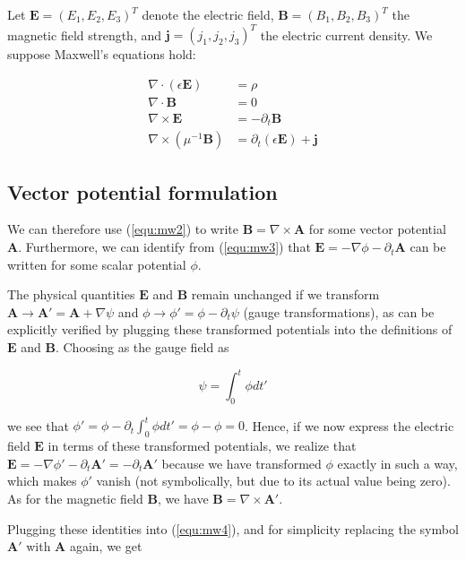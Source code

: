 \documentclass[11pt, a4paper]{article}
\begin{document}
Let $\mathbf{E} = (E_1, E_2, E_3)^T$ denote the electric field,
$\mathbf{B} = (B_1, B_2, B_3)^T$ the magnetic field strength, and 
$\mathbf{j} = (j_1, j_2, j_3)^T$ the electric current density. 
We suppose Maxwell's equations hold:

\begin{align}
    \nabla \cdot (\epsilon \mathbf{E}) &= \rho \label{equ:mw1} \\
    \nabla \cdot \mathbf{B} &= 0 \label{equ:mw2} \\
    \nabla \times \mathbf{E} &= -\partial_t \mathbf{B} \label{equ:mw3} \\
    \nabla \times (\mu^{-1} \mathbf{B}) &= \partial_t (\epsilon \mathbf{E}) + \mathbf{j} \label{equ:mw4}
\end{align}

\subsection{Vector potential formulation}
\label{subsec:vectorpot}

We can therefore use (\ref{equ:mw2}) to write $\mathbf{B} = \nabla \times \mathbf{A}$ for some vector
potential $\mathbf{A}$. Furthermore, we can identify from (\ref{equ:mw3}) that
$\mathbf{E} = -\nabla \phi - \partial_t \mathbf{A}$ can be written for some
scalar potential $\phi$.

The physical quantities $\mathbf{E}$ and $\mathbf{B}$ remain unchanged 
if we transform $\mathbf{A} \to \mathbf{A}' = \mathbf{A} + \nabla \psi$ and
$\phi \to \phi' = \phi - \partial_t \psi$ (gauge transformations), 
as can be explicitly verified by plugging these transformed potentials into the
definitions of $\mathbf{E}$ and $\mathbf{B}$. Choosing as the gauge field as 

\begin{equation}
    \psi = \int_0^t \phi dt'
\end{equation}

we see that $\phi' = \phi - \partial_t \int_0^t \phi dt' = \phi - \phi = 0$.
Hence, if we now express the electric field $\mathbf{E}$ in terms of these transformed 
potentials, we realize that $\mathbf{E} = -\nabla \phi' - \partial_t \mathbf{A}' = -\partial_t \mathbf{A}'$
because we have transformed $\phi$ exactly in such a way, which makes $\phi'$ vanish
(not symbolically, but due to its actual value being zero).
As for the magnetic field $\mathbf{B}$, we have $\mathbf{B} = \nabla \times \mathbf{A}'$.

Plugging these identities into (\ref{equ:mw4}), and for simplicity replacing 
the symbol $\mathbf{A}'$ with $\mathbf{A}$ again, we get
 
\end{document}
